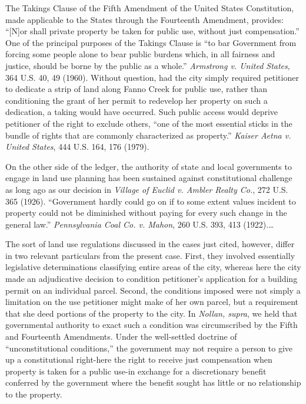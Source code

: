 The Takings Clause of the Fifth Amendment of the United States Constitution,
made applicable to the States through the Fourteenth Amendment, provides:
``[N]or shall private property be taken for public use, without just
compensation.'' One of the principal purposes of the Takings Clause is ``to bar
Government from forcing some people alone to bear public burdens which, in all
fairness and justice, should be borne by the public as a whole.''
\textit{Armstrong v. United States}, 364 U.S. 40, 49 (1960). Without question,
had the city simply required petitioner to dedicate a strip of land along Fanno
Creek for public use, rather than conditioning the grant of her permit to
redevelop her property on such a dedication, a taking would have occurred. Such
public access would deprive petitioner of the right to exclude others, ``one of
the most essential sticks in the bundle of rights that are commonly
characterized as property.'' \textit{Kaiser Aetna v. United States}, 444 U.S.
164, 176 (1979).

On the other side of the ledger, the authority of state and local governments to
engage in land use planning has been sustained against constitutional challenge
as long ago as our decision in \textit{Village of Euclid v. Ambler Realty Co.},
272 U.S. 365 (1926). ``Government hardly could go on if to some extent values
incident to property could not be diminished without paying for every such
change in the general law.'' \textit{Pennsylvania Coal Co. v. Mahon}, 260 U.S.
393, 413 (1922).\ldots

The sort of land use regulations discussed in the cases just cited, however,
differ in two relevant particulars from the present case. First, they involved
essentially legislative determinations classifying entire areas of the city,
whereas here the city made an adjudicative decision to condition petitioner's
application for a building permit on an individual parcel. Second, the
conditions imposed were not simply a limitation on the use petitioner might make
of her own parcel, but a requirement that she deed portions of the property to
the city. In \textit{Nollan, supra}, we held that governmental authority to
exact such a condition was circumscribed by the Fifth and Fourteenth Amendments.
Under the well-settled doctrine of ``unconstitutional conditions,'' the
government may not require a person to give up a constitutional right-here the
right to receive just compensation when property is taken for a public use-in
exchange for a discretionary benefit conferred by the government where the
benefit sought has little or no relationship to the property. 

